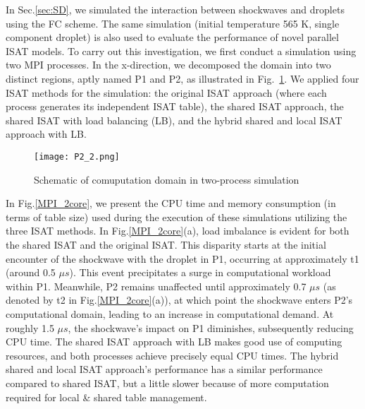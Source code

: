 
In Sec.\ref{sec:SD}, we simulated the interaction between shockwaves and droplets using the FC scheme. The same simulation (initial temperature 565 K, single component  droplet) is also used to evaluate the performance of novel parallel ISAT models. To carry out this investigation, we first conduct a simulation using two MPI processes. In the x-direction, we decomposed the domain into two distinct regions, aptly named P1 and P2, as illustrated in Fig.~\ref{MPI_P2}. We applied four ISAT methods for the simulation: the original ISAT approach (where each process generates its independent ISAT table), the shared ISAT approach, the shared ISAT with load balancing (LB), and the hybrid shared and local ISAT approach with LB.

\begin{figure}[htbp]
	\centering
	\texttt{[image: P2\_2.png]}
	\caption{Schematic of comuputation domain in  two-process simulation}
	\label{MPI_P2}
\end{figure}



In Fig.\ref{MPI_2core}, we present the CPU time and memory consumption (in terms of table size) used during the execution of these simulations utilizing the three ISAT methods. In Fig.\ref{MPI_2core}(a), load imbalance is evident for both the shared ISAT and the original ISAT. This disparity starts at the initial encounter of the shockwave with the droplet in P1, occurring at approximately t1 (around 0.5 $\mu s$). This event precipitates a surge in computational workload within P1. Meanwhile, P2 remains unaffected until approximately 0.7 $\mu s$ (as denoted by t2 in Fig.\ref{MPI_2core}(a)), at which point the shockwave enters P2's computational domain, leading to an increase in computational demand. At roughly 1.5 $\mu s$, the shockwave's impact on P1 diminishes, subsequently reducing CPU time. The shared ISAT approach with LB makes good use of computing resources, and both processes achieve precisely equal CPU times. The hybrid shared and local ISAT approach's performance  has a similar performance compared to shared ISAT, but a little slower because of more computation required for local \& shared table management.

